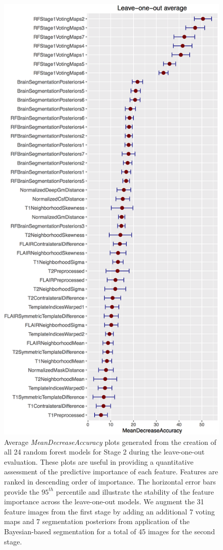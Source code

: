 \documentclass[11pt,]{article}
\begin{document}
\begin{figure}[htbp]
\centering
\includegraphics{Figures/averageLeaveOneOutStage2.png}
\caption{Average \emph{MeanDecreaseAccuracy} plots generated from the
creation of all 24 random forest models for Stage 2 during the
leave-one-out evaluation. These plots are useful in providing a
quantitative assessment of the predictive importance of each feature.
Features are ranked in descending order of importance. The horizontal
error bars provide the \(95^{th}\) percentile and illustrate the
stability of the feature importance across the leave-one-out models. We
augment the 31 feature images from the first stage by adding an
additional 7 voting maps and 7 segmentation posteriors from application
of the Bayesian-based segmentation for a total of 45 images for the
second stage.}
\end{figure}
\end{document}
